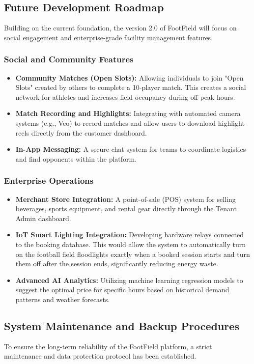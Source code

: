 \subsection{Future Development Roadmap}
Building on the current foundation, the version 2.0 of FootField will focus on social engagement and enterprise-grade facility management features.

\subsubsection{Social and Community Features}
\begin{itemize}
    \item \textbf{Community Matches (Open Slots):} Allowing individuals to join "Open Slots" created by others to complete a 10-player match. This creates a social network for athletes and increases field occupancy during off-peak hours.
    \item \textbf{Match Recording and Highlights:} Integrating with automated camera systems (e.g., Veo) to record matches and allow users to download highlight reels directly from the customer dashboard.
    \item \textbf{In-App Messaging:} A secure chat system for teams to coordinate logistics and find opponents within the platform.
\end{itemize}

\subsubsection{Enterprise Operations}
\begin{itemize}
    \item \textbf{Merchant Store Integration:} A point-of-sale (POS) system for selling beverages, sports equipment, and rental gear directly through the Tenant Admin dashboard.
    \item \textbf{IoT Smart Lighting Integration:} Developing hardware relays connected to the booking database. This would allow the system to automatically turn on the football field floodlights exactly when a booked session starts and turn them off after the session ends, significantly reducing energy waste.
    \item \textbf{Advanced AI Analytics:} Utilizing machine learning regression models to suggest the optimal price for specific hours based on historical demand patterns and weather forecasts.
\end{itemize}

\subsection{System Maintenance and Backup Procedures}
To ensure the long-term reliability of the FootField platform, a strict maintenance and data protection protocol has been established.

